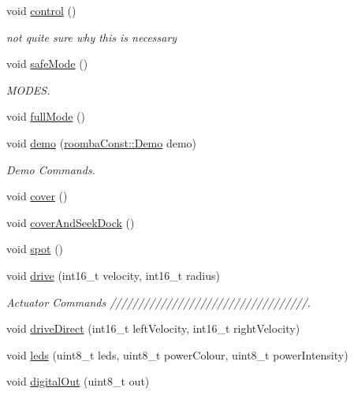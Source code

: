 \begin{DoxyCompactItemize}
void \hyperlink{class_arduino_roomba_ab3dc98fb859587d7a838e039f53fe07e}{control} ()
\begin{DoxyCompactList}\small\item\em not quite sure why this is necessary \item\end{DoxyCompactList}\item 
void \hyperlink{class_arduino_roomba_ac8fb620b0926e6faa570509834434ddf}{safeMode} ()
\begin{DoxyCompactList}\small\item\em MODES. \item\end{DoxyCompactList}\item 
void \hyperlink{class_arduino_roomba_ac4c6eb5bb47c95b7adf712926fa43edb}{fullMode} ()
\item 
void \hyperlink{class_arduino_roomba_a63640d010b0b37647f60040384bea428}{demo} (\hyperlink{namespaceroomba_const_a9c428597049a5dbe1d4c0b7851bd73ea}{roombaConst::Demo} demo)
\begin{DoxyCompactList}\small\item\em Demo Commands. \item\end{DoxyCompactList}\item 
void \hyperlink{class_arduino_roomba_acb2d35018865cc262ab638436b084362}{cover} ()
\item 
void \hyperlink{class_arduino_roomba_ab64590ea5cdd54a15eb62e96f61839b6}{coverAndSeekDock} ()
\item 
void \hyperlink{class_arduino_roomba_ad4cee03aee250ec956a178e0ca95b297}{spot} ()
\item 
void \hyperlink{class_arduino_roomba_af1d4b64c2e66d1ef8b5583d1d9442856}{drive} (int16\_\-t velocity, int16\_\-t radius)
\begin{DoxyCompactList}\small\item\em Actuator Commands ///////////////////////////////////. \item\end{DoxyCompactList}\item 
void \hyperlink{class_arduino_roomba_a9af2b51a8f3a72a0a906d412c5863fb7}{driveDirect} (int16\_\-t leftVelocity, int16\_\-t rightVelocity)
\item 
void \hyperlink{class_arduino_roomba_a03c310c1247df2636d236bb633529fc3}{leds} (uint8\_\-t leds, uint8\_\-t powerColour, uint8\_\-t powerIntensity)
\item 
void \hyperlink{class_arduino_roomba_af9adb4ea958dc11adcdbb89c394f0ccc}{digitalOut} (uint8\_\-t out)

\end{DoxyCompactItemize}
